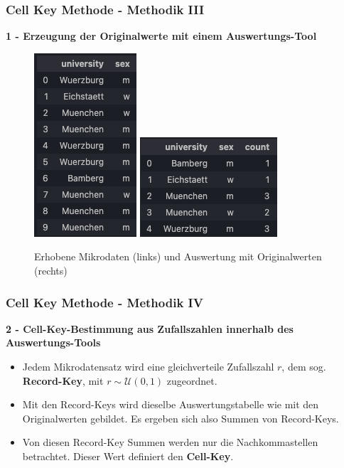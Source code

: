 \documentclass[aspectratio=169]{beamer}
\begin{document}
\begin{frame}{}
	\frametitle{Cell Key Methode - Methodik III}
    \textbf{1 - Erzeugung der Originalwerte mit einem Auswertungs-Tool} 
    \begin{figure}
		\centering
		\includegraphics[width=0.2\linewidth]{img/ckm_1.png}
        \includegraphics[width=0.25\linewidth]{img/ckm_2.png}
        \caption{Erhobene Mikrodaten (links) und Auswertung mit Originalwerten (rechts)}
	\end{figure} 
\end{frame}


\begin{frame}{}
	\frametitle{Cell Key Methode - Methodik IV}
    \textbf{2 - Cell-Key-Bestimmung aus Zufallszahlen innerhalb des Auswertungs-Tools} 
    \begin{itemize}
        \item Jedem Mikrodatensatz wird eine gleichverteile Zufallszahl $r$, dem sog. \textbf{Record-Key}, mit $r \sim \mathcal{U}(0, 1)$ zugeordnet.
        \item Mit den Record-Keys wird dieselbe Auswertungstabelle wie mit den Originalwerten gebildet. Es ergeben sich also Summen von Record-Keys.
        \item Von diesen Record-Key Summen werden nur die Nachkommastellen betrachtet. Dieser Wert definiert den \textbf{Cell-Key}.
    \end{itemize}
\end{frame}
\end{document}
